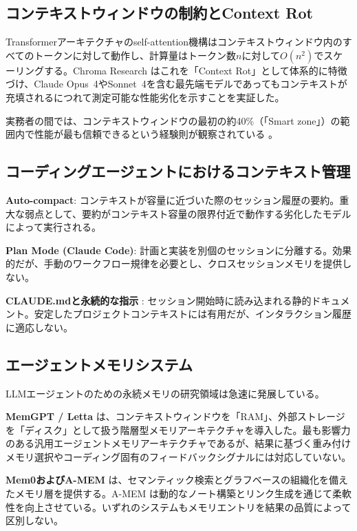 \documentclass[conference]{IEEEtran}
\begin{document}
\subsection{コンテキストウィンドウの制約とContext Rot}

Transformerアーキテクチャのself-attention機構はコンテキストウィンドウ内のすべてのトークンに対して動作し、計算量はトークン数$n$に対して$O(n^2)$でスケーリングする。Chroma Research \cite{ChromaResearch2025}はこれを「Context Rot」として体系的に特徴づけ、Claude Opus~4やSonnet~4を含む最先端モデルであってもコンテキストが充填されるにつれて測定可能な性能劣化を示すことを実証した。

実務者の間では、コンテキストウィンドウの最初の約40\%（「Smart zone」）の範囲内で性能が最も信頼できるという経験則が観察されている \cite{Huntley2025}。

\subsection{コーディングエージェントにおけるコンテキスト管理}

\textbf{Auto-compact}: コンテキストが容量に近づいた際のセッション履歴の要約。重大な弱点として、要約がコンテキスト容量の限界付近で動作する劣化したモデルによって実行される。

\textbf{Plan Mode (Claude Code)}: 計画と実装を別個のセッションに分離する。効果的だが、手動のワークフロー規律を必要とし、クロスセッションメモリを提供しない。

\textbf{CLAUDE.mdと永続的な指示} \cite{Anthropic2025}: セッション開始時に読み込まれる静的ドキュメント。安定したプロジェクトコンテキストには有用だが、インタラクション履歴に適応しない。

\subsection{エージェントメモリシステム}

LLMエージェントのための永続メモリの研究領域は急速に発展している。

\textbf{MemGPT / Letta} \cite{Packer2023MemGPT}は、コンテキストウィンドウを「RAM」、外部ストレージを「ディスク」として扱う階層型メモリアーキテクチャを導入した。最も影響力のある汎用エージェントメモリアーキテクチャであるが、結果に基づく重み付けメモリ選択やコーディング固有のフィードバックシグナルには対応していない。

\textbf{Mem0およびA-MEM} \cite{Chhikara2025Mem0}は、セマンティック検索とグラフベースの組織化を備えたメモリ層を提供する。A-MEM \cite{Xu2025AMEM}は動的なノート構築とリンク生成を通じて柔軟性を向上させている。いずれのシステムもメモリエントリを結果の品質によって区別しない。
\end{document}
